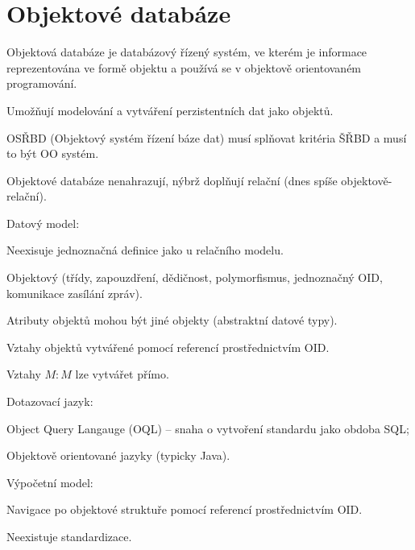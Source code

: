 
\section{Objektové databáze}

\begin{compactitem}
    \item Objektová databáze je databázový řízený systém, ve kterém je informace reprezentována ve formě objektu a používá se v objektově orientovaném programování.

    \item Umožňují modelování a vytváření perzistentních dat jako objektů.

    \item OSŘBD (Objektový systém řízení báze dat) musí splňovat kritéria ŠŘBD a musí to být OO systém.

    \item Objektové databáze nenahrazují, nýbrž doplňují relační (dnes spíše objektově-relační).

    \item Datový model: \begin{compactitem}
        \item Neexisuje jednoznačná definice jako u relačního modelu.
        \item Objektový (třídy, zapouzdření, dědičnost, polymorfismus, jednoznačný OID, komunikace zasílání zpráv).
        \item Atributy objektů mohou být jiné objekty (abstraktní datové typy).
        \item Vztahy objektů vytvářené pomocí referencí prostřednictvím OID.
        \item Vztahy $M:M$ lze vytvářet přímo.
    \end{compactitem}

    \item Dotazovací jazyk: \begin{compactitem}
        \item Object Query Langauge (OQL) -- snaha o vytvoření standardu jako obdoba SQL;
        \item Objektově orientované jazyky (typicky Java).
    \end{compactitem}

    \item Výpočetní model: \begin{compactitem}
        \item Navigace po objektové struktuře pomocí referencí prostřednictvím OID.
    \end{compactitem}

    \item Neexistuje standardizace.
\end{compactitem}

